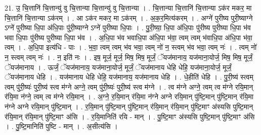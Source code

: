 \documentclass[17pt]{extarticle}
\begin{document}
21. उ॒ चि॒त्तानि॑ चि॒त्तान्यु॑ वु चि॒त्तान्या चि॒त्तान्यु॑ वु चि॒त्तान्या । . चि॒त्तान्या चि॒त्तानि॑ चि॒त्तान्या ऽक॑र मकर॒ मा चि॒त्तानि॑ चि॒त्तान्या ऽक॑रम् । . आ ऽक॑र मकर॒ मा ऽक॑रम् । . अ॒क॒र॒मित्य॑करम् । . अग्ने॑ पुरीष्य पुरी॒ष्याग्ने ऽग्ने॑ पुरीष्या धि॒पा अ॑धि॒पाः पु॑री॒ष्याग्ने ऽग्ने॑ पुरीष्या धि॒पाः । . पु॒री॒ष्या॒ धि॒पा अ॑धि॒पाः पु॑रीष्य पुरीष्या धि॒पा भ॑व भवा धि॒पाः पु॑रीष्य पुरीष्या धि॒पा भ॑व । . अ॒धि॒पा भ॑व भवाधि॒पा अ॑धि॒पा भ॑वा॒ त्वम् त्वम् भ॑वाधि॒पा अ॑धि॒पा भ॑वा॒ त्वम् । . अ॒धि॒पा इत्य॑धि - पाः । . भ॒वा॒ त्वम् त्वम् भ॑व भवा॒ त्वम् नो॑ न॒ स्त्वम् भ॑व भवा॒ त्वम् नः॑ । . त्वम् नो॑ न॒ स्त्वम् त्वम् नः॑ । . न॒ इति॑ नः । . इष॒ मूर्ज॒ मूर्ज॒ मिष॒ मिष॒ मूर्जं॒ ॅयज॑मानाय॒ यज॑माना॒योर्ज॒ मिष॒ मिष॒ मूर्जं॒ ॅयज॑मानाय । . ऊर्जं॒ ॅयज॑मानाय॒ यज॑माना॒योर्ज॒ मूर्जं॒ ॅयज॑मानाय धेहि धेहि॒ यज॑माना॒योर्ज॒ मूर्जं॒ ॅयज॑मानाय धेहि । . यज॑मानाय धेहि धेहि॒ यज॑मानाय॒ यज॑मानाय धेहि । . धे॒हीति॑ धेहि । . पु॒री॒ष्य॑ स्त्वम् त्वम् पु॑री॒ष्यः॑ पुरी॒ष्य॑ स्त्व म॑ग्ने अग्ने॒ त्वम् पु॑री॒ष्यः॑ पुरी॒ष्य॑ स्त्व म॑ग्ने । . त्व म॑ग्ने अग्ने॒ त्वम् त्व म॑ग्ने रयि॒मान् र॑यि॒मा न॑ग्ने॒ त्वम् त्व म॑ग्ने रयि॒मान् । . अ॒ग्ने॒ र॒यि॒मान् र॑यि॒मा न॑ग्ने अग्ने रयि॒मान् पु॑ष्टि॒मान् पु॑ष्टि॒मान् र॑यि॒मा न॑ग्ने अग्ने रयि॒मान् पु॑ष्टि॒मान् । . र॒यि॒मान् पु॑ष्टि॒मान् पु॑ष्टि॒मान् र॑यि॒मान् र॑यि॒मान् पु॑ष्टि॒माꣳ अ॑स्यसि पुष्टि॒मान् र॑यि॒मान् र॑यि॒मान् पु॑ष्टि॒माꣳ अ॑सि । . र॒यि॒मानिति॑ रयि - मान् । . पु॒ष्टि॒माꣳ अ॑स्यसि पुष्टि॒मान् पु॑ष्टि॒माꣳ अ॑सि । . पु॒ष्टि॒मानिति॑ पुष्टि - मान् । . अ॒सीत्य॑सि । \newline
\end{document}
